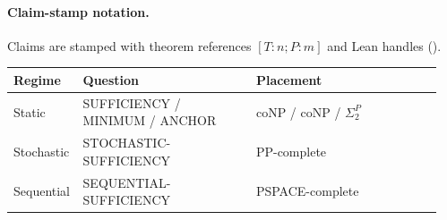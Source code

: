 \paragraph{Claim-stamp notation.}
Claims are stamped with theorem references $[T:n; P:m]$ and Lean handles ().

\begingroup
\footnotesize
\noindent
\begin{tabularx}{\linewidth}{@{}>{\raggedright\arraybackslash}p{0.12\linewidth}>{\raggedright\arraybackslash}p{0.40\linewidth}>{\raggedright\arraybackslash}p{0.43\linewidth}@{}}
\toprule
\textbf{Regime} & \textbf{Question} & \textbf{Placement} \\
\midrule
Static & SUFFICIENCY / MINIMUM / ANCHOR & coNP / coNP / $\Sigma_2^P$ \\
Stochastic & STOCHASTIC-SUFFICIENCY & PP-complete \\
Sequential & SEQUENTIAL-SUFFICIENCY & PSPACE-complete \\
\bottomrule
\end{tabularx}
\endgroup

